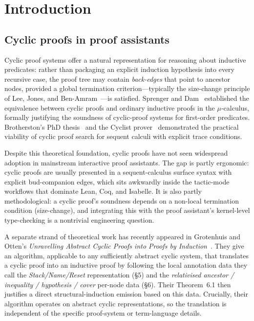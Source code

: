\section{Introduction}
\label{sec:introduction}

\subsection{Cyclic proofs in proof assistants}

Cyclic proof systems offer a natural representation for reasoning about
inductive predicates: rather than packaging an explicit induction hypothesis
into every recursive case, the proof tree may contain \emph{back-edges} that
point to ancestor nodes, provided a global termination criterion---typically
the size-change principle of Lee, Jones, and Ben-Amram~\cite{lee2001size}---is
satisfied. Sprenger and Dam~\cite{sprenger2003structure} established the
equivalence between cyclic proofs and ordinary inductive proofs in the
\(\mu\)-calculus, formally justifying the soundness of cyclic-proof systems
for first-order predicates. Brotherston's PhD thesis~\cite{brotherston2006phd}
and the Cyclist prover~\cite{brotherston2012cyclist} demonstrated the
practical viability of cyclic proof search for sequent calculi with explicit
trace conditions.

Despite this theoretical foundation, cyclic proofs have not seen widespread
adoption in mainstream interactive proof assistants. The gap is partly
ergonomic: cyclic proofs are usually presented in a sequent-calculus surface
syntax with explicit bud-companion edges, which sits awkwardly inside the
tactic-mode workflows that dominate Lean, Coq, and Isabelle. It is also
partly methodological: a cyclic proof's soundness depends on a
non-local termination condition (size-change), and integrating this with the
proof assistant's kernel-level type-checking is a nontrivial engineering
question.

A separate strand of theoretical work has recently appeared in
Grotenhuis and Otten's \emph{Unravelling Abstract Cyclic Proofs into Proofs
by Induction}~\cite{grotenhuis2026unravelling}. They give an algorithm,
applicable to any sufficiently abstract cyclic system, that translates a
cyclic proof into an inductive proof by following the local annotation
data they call the \emph{Stack/Name/Reset} representation (§5) and the
\emph{relativised ancestor / inequality / hypothesis / cover} per-node data
(§6). Their Theorem~6.1 then justifies a direct structural-induction emission
based on this data. Crucially, their algorithm operates on abstract cyclic
representations, so the translation is independent of the specific
proof-system or term-language details.

